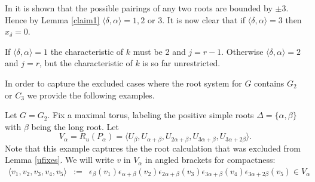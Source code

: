 In \cite[\S 3.4]{carter1989simple} it is shown that the possible pairings of any two roots are bounded by $\pm 3$. Hence by Lemma \ref{claim1} $\langle \delta, \alpha \rangle = 1, 2$ or 3. It is now clear that if $\langle \delta, \alpha \rangle = 3$ then $x_\delta = 0$.

If $\langle \delta, \alpha \rangle = 1$ the characteristic of $k$ must be 2 and $j = r-1$. Otherwise $\langle \delta, \alpha \rangle = 2$ and $j = r$, but the characteristic of $k$ is so far unrestricted.

In order to capture the excluded cases where the root system for $G$ contains $G_2$ or $C_3$ we provide the following examples.

\begin{example} Let $G=G_2$. Fix a maximal torus, labeling the positive simple roots $\Delta=\{\alpha, \beta\}$ with $\beta$ being the long root. Let 
	\begin{displaymath}
		V_\alpha = R_u(P_\alpha) = \langle U_\beta, U_{\alpha+\beta}, U_{2\alpha+\beta}, U_{3\alpha+\beta}, U_{3\alpha+2\beta}\rangle.
	\end{displaymath}
	Note that this example captures the the root calculation that was excluded from Lemma \ref{ufixes}.
	We will write $v$ in $V_\alpha$ in angled brackets for compactness:
	\begin{eqnarray*}
		\langle 
		v_1,
		v_2,
		v_3,
		v_4,
		v_5
		\rangle &:=&
		\epsilon_{\beta}(v_1)
		\epsilon_{\alpha+\beta}(v_2)
		\epsilon_{2\alpha+\beta}(v_3)
		\epsilon_{3\alpha+\beta}(v_4)
		\epsilon_{3\alpha+2\beta}(v_5) \in V_\alpha
	\end{eqnarray*}


\end{example}

